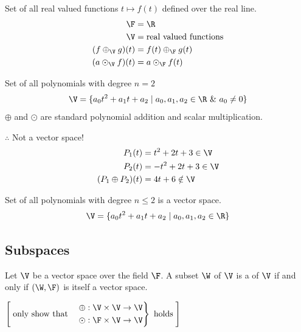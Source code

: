 \begin{example}
Set of all real valued functions $t\mapsto f(t)$ defined over the real line.
\begin{align*}
\F &= \R\\
\V &= \text{real valued functions}\\
(f\oplus_{\V} g)(t) &= f(t)\oplus_{\F} g(t)\\
(a\odot_{\V} f)(t) &= a\odot_{\F} f(t)
\end{align*}
\end{example}

\begin{example}
Set of all polynomials with degree $n=2$
\[ \V = \{a_0t^2+a_1t+a_2 \mid a_0,a_1,a_2\in\R \ \&\ a_0\neq0\} \]
$\oplus$ and $\odot$ are standard polynomial addition and scalar multiplication.

$\therefore$ Not a vector space!
\begin{align*}
P_1(t) &= t^2+2t+3 \in\V\\
P_2(t) &= -t^2+2t+3 \in\V\\
(P_1\oplus P_2)(t) &= 4t+6\notin\V
\end{align*}
\end{example}

\begin{example}
Set of all polynomials with degree $n\le2$ is a vector space.
\[ \V = \{a_0t^2+a_1t+a_2 \mid a_0,a_1,a_2\in\R\} \]
\end{example}

\subsection{Subspaces}\label{ss:subspaces}
\begin{definition}
Let $\V$ be a vector space over the field $\F$. A subset $\W$ of $\V$ is a  of $\V$ if and only if $(\W,\F)$ is itself a vector space.
\end{definition}
\begin{center}
\qquad
$\left[\;\text{only show that}\quad \left.\begin{aligned}\oplus&: \V\times\V\to\V\\ \odot&: \F\times\V\to\V\end{aligned}\right\}\ \text{holds}\;\right]$
\end{center}

